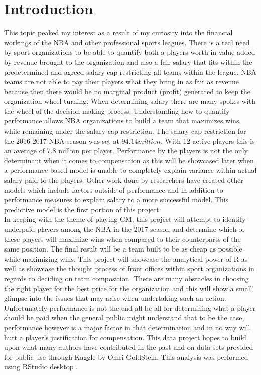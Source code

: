 \documentclass[12pt,english]{article}
\begin{document}
\pagebreak{}


\section{Introduction}\label{sec:intro}
\linespread{2}
\begin{doublespace}
\indent This topic peaked my interest as a result of my curiosity into the financial workings of the NBA and other professional sports leagues.
There is a real need by sport organizations to be able to quantify both a players worth in value added by revenue brought to the organization and also 
a fair salary that fits within the predetermined and agreed salary cap restricting all teams within the league. NBA teams are not able to pay their players what
they bring in as fair as revenue because then there would be no marginal product (profit) generated to keep the organization wheel turning. When determining salary there
are many spokes with the wheel of the decision making process. Understanding how to quantify performance allows NBA organizations to build a team that maximizes wins 
while remaining under the salary cap restriction. The salary cap restriction for the 2016-2017 NBA season was set at $94.14 million$. With 12 active players this is an average of 
7.8 million per player. Performance by the players is not the only determinant when it comes to compensation as this will be showcased later when a performance based model is 
unable to completely explain variance within actual salary
paid to the players. Other work done by researchers have created other models which include factors outside of performance and in addition to performance measures to explain salary to 
a more successful model. This predictive model is the first portion of this project. \\
\indent In keeping with the theme of playing GM, this project will attempt to identify underpaid players among the NBA in the 2017 season and determine which of these players will maximize
wins when compared to their counterparts of the same position. The final result will be a team built to be as cheap as possible while maximizing wins. This project will showcase the analytical power of R as well as showcase the thought process of front offices within sport organizations in regards to deciding on team composition. There are many obstacles in choosing the right player for the best price for the organization and this will show a small glimpse into the issues that may arise when undertaking such an action. 
Unfortunately performance is not the end all be all for determining what a player should be paid when the general public might understand that to be the case, performance however is a major factor in that determination and in no way will hurt a player's justification for compensation. This data project hopes to build upon what many authors have contributed in the past and on data sets provided for public use through Kaggle by Omri GoldStein. This analysis was performed using RStudio desktop \cite{r13}. 

\end{doublespace}
\end{document}
